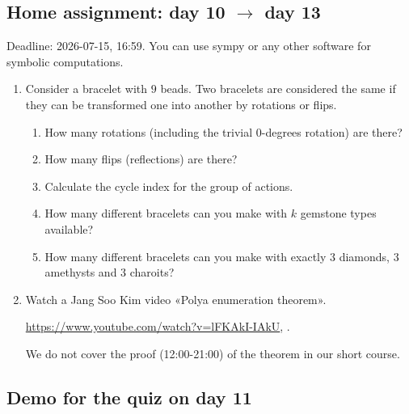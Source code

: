 \documentclass[12pt]{article}
\begin{document}





\subsection*{Home assignment: day 10 $\to$ day 13}

Deadline: 2026-07-15, 16:59. 
You can use sympy or any other software for symbolic computations.

\begin{enumerate}
\item Consider a bracelet with $9$ beads. Two bracelets are considered the same if they can be transformed one into another by rotations or flips.  
\begin{enumerate}[label=\alph*)]
\item How many rotations (including the trivial $0$-degrees rotation) are there?
\item How many flips (reflections) are there?
\item Calculate the cycle index for the group of actions. 
\item How many different bracelets can you make with $k$ gemstone types available?
\item How many different bracelets can you make with exactly $3$ diamonds, $3$ amethysts and $3$ charoits?
\end{enumerate}


    \item Watch a Jang Soo Kim video «Polya enumeration theorem». %

    \url{https://www.youtube.com/watch?v=lFKAkI-IAkU},
    .

    We do not cover the proof (12:00-21:00) of the theorem in our short course. 

\end{enumerate}

\subsection*{Demo for the quiz on day 11}
\end{document}
